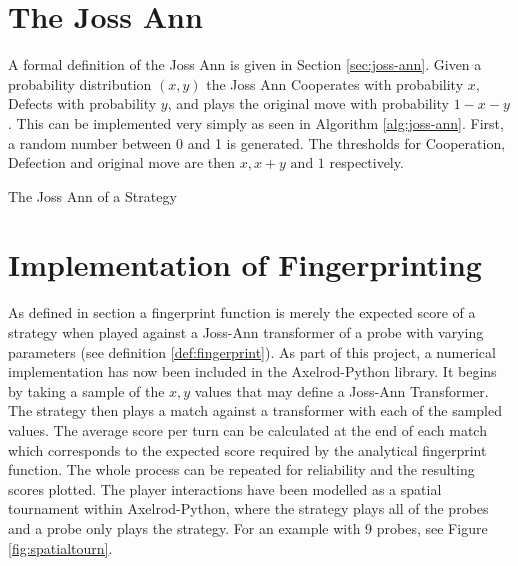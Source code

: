 \section{The Joss Ann}

A formal definition of the Joss Ann is given in Section \ref{sec:joss-ann}.
Given a probability distribution $(x, y)$ the Joss Ann Cooperates with probability $x$, Defects with probability $y$, and plays the original move with probability $1 -x-y$.
This can be implemented very simply as seen in Algorithm \ref{alg:joss-ann}.
First, a random number between 0 and 1 is generated.
The thresholds for Cooperation, Defection and original move are then $x, x+y \text{ and } 1$ respectively.

\begin{algorithm}[H]
 \caption{The Joss Ann of a Strategy}
 \label{alg:joss-ann}
\end{algorithm}

\section{Implementation of Fingerprinting}\label{sec:fingerprint-implementation}

As defined in section a fingerprint function is merely the expected score of a strategy when played against a Joss-Ann transformer of a probe with varying parameters (see definition \ref{def:fingerprint}).
As part of this project, a numerical implementation has now been included in the Axelrod-Python library.
It begins by taking a sample of the $x,y$ values that may define a Joss-Ann Transformer.
The strategy then plays a match against a transformer with each of the sampled values.
The average score per turn can be calculated at the end of each match which corresponds to the expected score required by the analytical fingerprint function.
The whole process can be repeated for reliability and the resulting scores plotted.
The player interactions have been modelled as a spatial tournament within Axelrod-Python, where the strategy plays all of the probes and a probe only plays the strategy.
For an example with 9 probes, see Figure \ref{fig:spatialtourn}.

